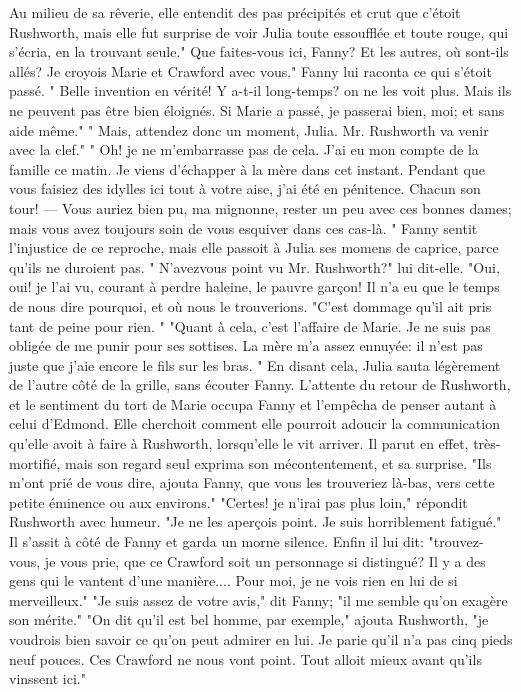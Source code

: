 Au milieu de sa rêverie, elle entendit des pas précipités et crut que c'étoit Rushworth, mais elle fut surprise de voir Julia toute essoufflée et toute rouge, qui s'écria, en la trouvant seule." Que faites-vous ici, Fanny?
Et les autres, où sont-ils allés? Je croyois Marie et Crawford avec vous."
Fanny lui raconta ce qui s'étoit passé.
" Belle invention en vérité! Y a-t-il long-temps? on ne les voit plus. Mais ils ne peuvent pas être bien éloignés. Si Marie a passé, je passerai bien, moi; et sans aide même."
" Mais, attendez donc un moment, Julia. Mr. Rushworth va venir avec la clef."
" Oh! je ne m'embarrasse pas de cela. J'ai eu mon compte de la famille ce matin. Je viens d'échapper à la mère dans cet instant. Pendant que vous faisiez des idylles ici tout à votre aise, j'ai été en pénitence. Chacun\setcounter{page}{524} son tour! — Vous auriez bien pu, ma mignonne, rester un peu avec ces bonnes dames; mais vous avez toujours soin de vous esquiver dans ces cas-là. "
Fanny sentit l'injustice de ce reproche, mais elle passoit à Julia ses momens de caprice, parce qu'ils ne duroient pas. " N'avezvous point vu Mr. Rushworth?" lui dit-elle.
"Oui, oui! je l'ai vu, courant à perdre haleine, le pauvre garçon! Il n'a eu que le temps de nous dire pourquoi, et où nous le trouverions.
"C'est dommage qu'il ait pris tant de peine pour rien. "
"Quant à cela, c'est l'affaire de Marie. Je ne suis pas obligée de me punir pour ses sottises. La mère m'a assez ennuyée: il n'est pas juste que j'aie encore le fils sur les bras. "
En disant cela, Julia sauta légèrement de l'autre côté de la grille, sans écouter Fanny.
L'attente du retour de Rushworth, et le sentiment du tort de Marie occupa Fanny et l'empêcha de penser autant à celui d'Edmond. Elle cherchoit comment elle pourroit adoucir la communication qu'elle avoit à faire à Rushworth, lorsqu'elle le vit arriver. Il parut en effet, très-mortifié, mais son regard seul exprima son mécontentement, et sa surprise.
\setcounter{page}{525} "Ils m'ont prié de vous dire, ajouta Fanny, que vous les trouveriez là-bas, vers cette petite éminence ou aux environs."
"Certes! je n'irai pas plus loin," répondit Rushworth avec humeur. "Je ne les aperçois point. Je suis horriblement fatigué." Il s'assit à côté de Fanny et garda un morne silence. Enfin il lui dit: "trouvez-vous, je vous prie, que ce Crawford soit un personnage si distingué? Il y a des gens qui le vantent d'une manière.... Pour moi, je ne vois rien en lui de si merveilleux."
"Je suis assez de votre avis," dit Fanny; "il me semble qu'on exagère son mérite."
"On dit qu'il est bel homme, par exemple," ajouta Rushworth, "je voudrois bien savoir ce qu'on peut admirer en lui. Je parie qu'il n'a pas cinq pieds neuf pouces. Ces Crawford ne nous vont point. Tout alloit mieux avant qu'ils vinssent ici."
